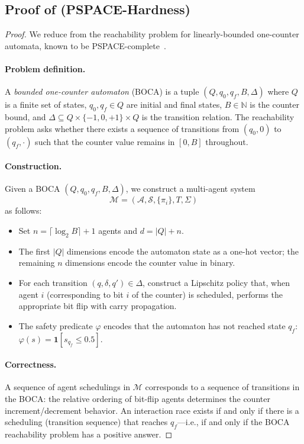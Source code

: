 \documentclass[11pt]{article}
\newcommand{\N}{\mathbb{N}}
\newcommand{\calS}{\mathcal{S}}
\newcommand{\calA}{\mathcal{A}}
\newcommand{\calM}{\mathcal{M}}
\newcommand{\abs}[1]{\lvert #1 \rvert}
\begin{document}
\subsection{Proof of \texorpdfstring{}{Theorem 2.3} (PSPACE-Hardness)}
\label{app:pspace-proof}

\begin{proof}
We reduce from the reachability problem for linearly-bounded one-counter
automata, known to be PSPACE-complete~\cite{fearnley2015reachability}.

\paragraph{Problem definition.}
A \emph{bounded one-counter automaton} (BOCA) is a tuple $(Q, q_0, q_f, B, \Delta)$
where $Q$ is a finite set of states, $q_0, q_f \in Q$ are initial and final states,
$B \in \N$ is the counter bound, and $\Delta \subseteq Q \times \{-1, 0, +1\} \times Q$
is the transition relation. The reachability problem asks whether there exists
a sequence of transitions from $(q_0, 0)$ to $(q_f, \cdot)$ such that the counter
value remains in $[0, B]$ throughout.

\paragraph{Construction.}
Given a BOCA $(Q, q_0, q_f, B, \Delta)$, we construct a multi-agent
system
\[
  \calM = (\calA, \calS, \{\pi_i\}, T, \Sigma)
\]
as follows:

\begin{itemize}[nosep]
\item Set $n = \lceil \log_2 B \rceil + 1$ agents and $d = \abs{Q} + n$.
\item The first $\abs{Q}$ dimensions encode the automaton state as a one-hot
vector; the remaining $n$ dimensions encode the counter value in binary.
\item For each transition $(q, \delta, q') \in \Delta$, construct a Lipschitz
policy that, when agent $i$ (corresponding to bit $i$ of the counter)
is scheduled, performs the appropriate bit flip with carry propagation.
\item The safety predicate $\varphi$ encodes that the automaton has not
reached state $q_f$: $\varphi(s) = \mathbf{1}[s_{q_f} \leq 0.5]$.
\end{itemize}

\paragraph{Correctness.}
A sequence of agent schedulings in $\calM$ corresponds to a sequence of
transitions in the BOCA: the relative ordering of bit-flip agents determines
the counter increment/decrement behavior. An interaction race exists if and
only if there is a scheduling (transition sequence) that reaches $q_f$---i.e.,
if and only if the BOCA reachability problem has a positive answer.


\end{proof}
\end{document}
